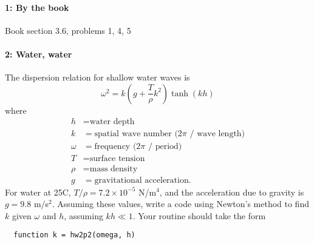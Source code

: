 \documentclass[12pt, leqno]{article}
\begin{document}

\paragraph*{1: By the book}
Book section 3.6, problems 1, 4, 5

\paragraph*{2: Water, water}
The dispersion relation for shallow water waves is
\[
  \omega^2 = k \left(g + \frac{T}{\rho} k^2 \right) \tanh(k h)
\]
where
\begin{align*}
  h &= \mbox{water depth} \\
  k &= \mbox{spatial wave number ($2\pi$ / wave length)} \\
  \omega &= \mbox{frequency ($2\pi$ / period)} \\
  T &= \mbox{surface tension} \\
  \rho &= \mbox{mass density} \\
  g &= \mbox{gravitational acceleration}.
\end{align*}
For water at 25C, $T/\rho = 7.2 \times 10^{-5}$ N/m$^4$, 
and the acceleration due to gravity is $g = 9.8$ m/s$^2$.
Assuming these values, write a code using Newton's method
to find $k$ given $\omega$ and $h$, assuming $kh \ll 1$.
Your routine should take the form
\begin{lstlisting}
  function k = hw2p2(omega, h)
\end{lstlisting}
\end{document}
